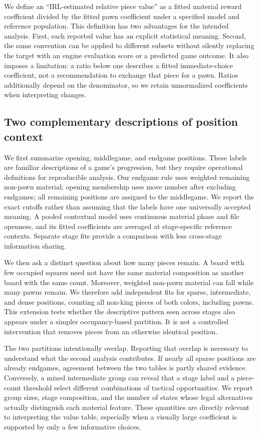 We define an ``IRL-estimated relative piece value'' as a fitted material reward coefficient divided by the fitted pawn coefficient under a specified model and reference population. This definition has two advantages for the intended analysis. First, each reported value has an explicit statistical meaning. Second, the same convention can be applied to different subsets without silently replacing the target with an engine evaluation score or a predicted game outcome. It also imposes a limitation: a ratio below one describes a fitted immediate-choice coefficient, not a recommendation to exchange that piece for a pawn. Ratios additionally depend on the denominator, so we retain unnormalized coefficients when interpreting changes.

\subsection{Two complementary descriptions of position context}
We first summarize opening, middlegame, and endgame positions. These labels are familiar descriptions of a game's progression, but they require operational definitions for reproducible analysis. Our endgame rule uses weighted remaining non-pawn material; opening membership uses move number after excluding endgames; all remaining positions are assigned to the middlegame. We report the exact cutoffs rather than assuming that the labels have one universally accepted meaning. A pooled contextual model uses continuous material phase and file openness, and its fitted coefficients are averaged at stage-specific reference contexts. Separate stage fits provide a comparison with less cross-stage information sharing.

We then ask a distinct question about how many pieces remain. A board with few occupied squares need not have the same material composition as another board with the same count. Moreover, weighted non-pawn material can fall while many pawns remain. We therefore add independent fits for sparse, intermediate, and dense positions, counting all non-king pieces of both colors, including pawns. This extension tests whether the descriptive pattern seen across stages also appears under a simpler occupancy-based partition. It is not a controlled intervention that removes pieces from an otherwise identical position.

The two partitions intentionally overlap. Reporting that overlap is necessary to understand what the second analysis contributes. If nearly all sparse positions are already endgames, agreement between the two tables is partly shared evidence. Conversely, a mixed intermediate group can reveal that a stage label and a piece-count threshold select different combinations of tactical opportunities. We report group sizes, stage composition, and the number of states whose legal alternatives actually distinguish each material feature. These quantities are directly relevant to interpreting the value table, especially when a visually large coefficient is supported by only a few informative choices.

